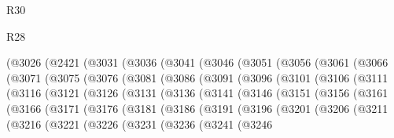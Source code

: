 \begin{lexlean}{R30}
\begin{lexlean}{R28}
\begin{coremodule}
{{{{{{{{{{{{{{{{{{{{{{{{{{{{{{{{{{{{{{{{{{{{{{{{{{{{{{{{{{{{{{{{{{{{{{{{{{{{{{{{{{{{{{{{{{{{{{{{{{{{{{{{{{{{{{{{{{{{{{{{{{{{{{{{{{{{{{{{{{{{{{{    (@3026
      (@2421
        (@3031
          (@3036
            (@3041
              (@3046
                (@3051
                  (@3056
                    (@3061
                      (@3066
                        (@3071
                          (@3075
                            (@3076
                              (@3081
                                (@3086
                                  (@3091
                                    (@3096
                                      (@3101
                                        (@3106
                                          (@3111
                                            (@3116
                                              (@3121
                                                (@3126
                                                  (@3131
                                                    (@3136
                                                      (@3141
                                                        (@3146
                                                          (@3151
                                                            (@3156
                                                              (@3161
                                                                (@3166
                                                                  (@3171
                                                                    (@3176
                                                                      (@3181
                                                                        (@3186
                                                                          (@3191
                                                                            (@3196
                                                                              (@3201
                                                                                (@3206
                                                                                  (@3211
                                                                                    (@3216
                                                                                      (@3221
                                                                                        (@3226
                                                                                          (@3231
                                                                                            (@3236
                                                                                              (@3241
                                                                                                (@3246
}}}}}}}}}}}}}}}}}}}}}}}}}}}}}}}}}}}}}}}}}}}}}}}}}}}}}}}}}}}}}}}}}}}}}}}}}}}}}}}}}}}}}}}}}}}}}}}}}}}}}}}}}}}}}}}}}}}}}}}}}}}}}}}}}}}}}}}}}}}}}}}
\end{coremodule}
\end{lexlean}
\end{lexlean}
